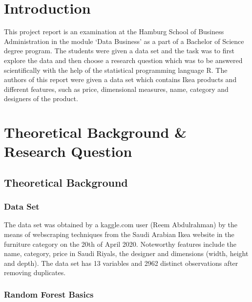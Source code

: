 \documentclass[a4paper, nobind]{templates/ociamthesis}
\begin{document}
\flushbottom

\hypertarget{intro}{%
\chapter{Introduction}\label{intro}}

This project report is an examination at the Hamburg School of Business Administration in the module `Data Business' as a part of a Bachelor of Science degree program. The students were given a data set and the task was to first explore the data and then choose a research question which was to be answered scientifically with the help of the statistical programming language R. The authors of this report were given a data set which contains Ikea products and different features, such as price, dimensional measures, name, category and designers of the product.

\hypertarget{theoretical-background-research-question}{%
\chapter{Theoretical Background \& Research Question}\label{theoretical-background-research-question}}

\hypertarget{theoretical_background}{%
\section{Theoretical Background}\label{theoretical_background}}

\hypertarget{data-set}{%
\subsection{Data Set}\label{data-set}}

The data set was obtained by a kaggle.com user (Reem Abdulrahman) by the means of webscraping techniques from the Saudi Arabian Ikea website in the furniture category on the 20th of April 2020. Noteworthy features include the name, category, price in Saudi Riyals, the designer and dimensions (width, height and depth). The data set has 13 variables and 2962 distinct observations after removing duplicates.

\hypertarget{random-forest-basics}{%
\subsection{Random Forest Basics}\label{random-forest-basics}}
\end{document}
